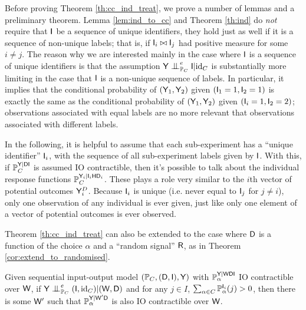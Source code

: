 Before proving Theorem \ref{th:cc_ind_treat}, we prove a number of lemmas and a preliminary theorem. Lemma \ref{lem:ind_to_cc} and Theorem \ref{th:ind} do \emph{not} require that $\mathsf{I}$ be a sequence of unique identifiers, they hold just as well if it is a sequence of non-unique labels; that is, if $\mathsf{I}_i\bowtie \mathsf{I}_j$ had positive measure for some $i\neq j$. The reason why we are interested mainly in the case where $\mathsf{I}$ is a sequence of unique identifiers is that the assumption $\RV{Y}\CI^e_{\prob{P}_C} \RV{I}|\text{id}_C$ is substantially more limiting in the case that $\mathsf{I}$ is a non-unique sequence of labels. In particular, it implies that the conditional probability of $(\mathsf{Y}_1,\mathsf{Y}_2)$ given $(\mathsf{I}_1=1,\mathsf{I}_2=1)$ is exactly the same as the conditional probability of $(\mathsf{Y}_1,\mathsf{Y}_2)$ given $(\mathsf{I}_i=1,\mathsf{I}_2=2)$; observations associated with equal labels are no more relevant that observations associated with different labels.

In the following, it is helpful to assume that each sub-experiment has a ``unique identifier'' $\mathsf{I}_i$, with the sequence of all sub-experiment labels given by $\mathsf{I}$. With this, if $\mathbb{P}_C^{\mathsf{Y}|\mathsf{DI}}$ is assumed IO contractible, then it's possible to talk about the individual response functions $\mathbb{P}_C^{\mathsf{Y}_i|\mathsf{I}_i\mathsf{H}\mathsf{D}_i}$. These plays a role very similar to the $i$th vector of potential outcomes $\mathsf{Y}^D_i$. Because $\mathsf{I}_i$ is unique (i.e. never equal to $\mathsf{I}_j$ for $j\neq i$), only one observation of any individual is ever given, just like only one element of a vector of potential outcomes is ever observed.

Theorem \ref{th:cc_ind_treat} can also be extended to the case where $\mathsf{D}$ is a function of the choice $\alpha$ and a ``random signal'' $\mathsf{R}$, as in Theorem \ref{cor:extend_to_randomised}.

\begin{lemma}\label{lem:ind_to_cc}
Given sequential input-output model $(\mathbb{P}_C,(\mathsf{D},\mathsf{I}),\mathsf{Y})$ with $\mathbb{P}_\alpha^{\mathsf{Y}|\mathsf{WDI}}$ IO contractible over $\mathsf{W}$, if $\RV{Y}\CI_{\prob{P}_C}^e (\RV{I},\text{id}_C)|(\RV{W},\RV{D})$ and for any $j\in I$, $\sum_{\alpha\in C} \mathbb{P}_\alpha^{\mathsf{I}_i}(j)>0$, then there is some $\mathsf{W}'$ such that $\mathbb{P}_\alpha^{\mathsf{Y}|\mathsf{W}'\mathsf{D}}$ is also IO contractible over $\mathsf{W}$.
\end{lemma}

